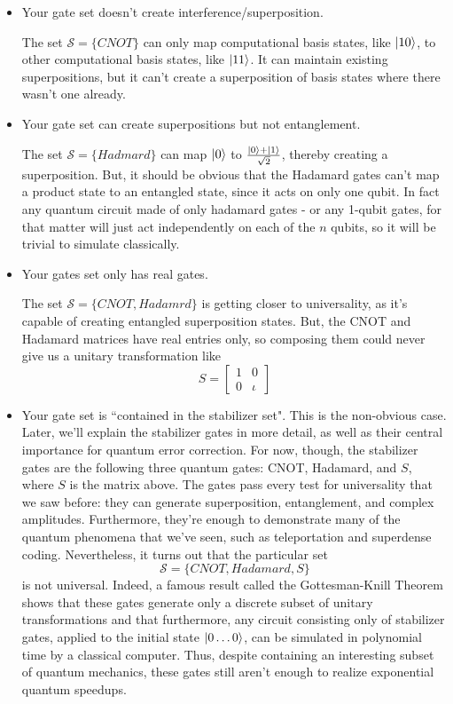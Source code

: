 \begin{itemize}
    \item Your gate set doesn't create interference/superposition.
    \begin{example}
        The set $\mathcal{S}=\{CNOT\}$ can only map computational basis states, like $\ket{10}$, to other computational basis states, like $\ket{11}$. It can maintain existing superpositions, but it can't create a superposition of basis states where there wasn't one already.
    \end{example}
    \item Your gate set can create superpositions but not entanglement.
    \begin{example}
        The set $\mathcal{S}=\{Hadmard\}$ can map $\ket{0}$ to $\frac{\ket{0}+\ket{1}}{\sqrt{2}}$, thereby creating a superposition. But, it should be obvious that the Hadamard gates can't map a product state to an entangled state, since it acts on only one qubit. In fact any quantum circuit made of only hadamard gates - or any 1-qubit gates, for that matter will just act independently on each of the $n$ qubits, so it will be trivial to simulate classically.
    \end{example}
    \item Your gates set only has real gates.
    \begin{example}
        The set $\mathcal{S}=\{CNOT,Hadamrd\}$ is getting closer to universality, as it's capable of creating entangled superposition states. But, the CNOT and Hadamard matrices have real entries only, so composing them could never give us a unitary transformation like
        \[
        S=\begin{bmatrix} 1 & 0\\ 0 & \iota \end{bmatrix}
        \]
    \end{example}
    \item Your gate set is ``contained in the stabilizer set". This is the non-obvious case. Later, we'll explain the stabilizer gates in more detail, as well as their central importance for quantum error correction. For now, though, the stabilizer gates are the following three quantum gates: CNOT, Hadamard, and $S$, where $S$ is the matrix above. The gates pass every test for universality that we saw before: they can generate superposition, entanglement, and complex amplitudes. Furthermore, they're enough to demonstrate many of the quantum phenomena that we've seen, such as teleportation and superdense coding. Nevertheless, it turns out that the particular set 
    \[
    \mathcal{S}=\{CNOT, Hadamard, S\}
    \]
    is not universal. Indeed, a famous result called the Gottesman-Knill Theorem shows that these gates generate only a discrete subset of unitary transformations and that furthermore, any circuit consisting only of stabilizer gates, applied to the initial state $\ket{0\ldots 0}$, can be simulated in polynomial time by a classical computer. Thus, despite containing an interesting subset of quantum mechanics, these gates still aren't enough to realize exponential quantum speedups.
\end{itemize}

